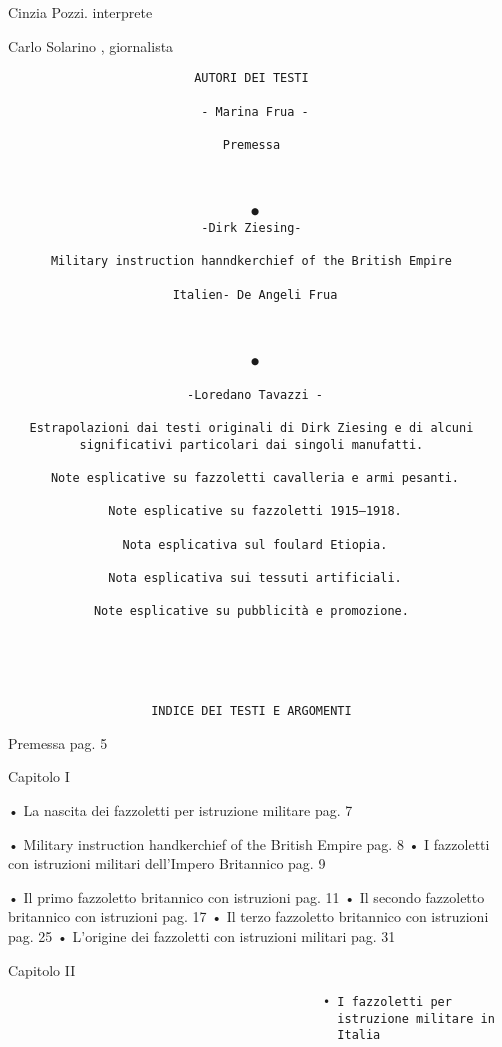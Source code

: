 Cinzia Pozzi. interprete

Carlo Solarino , giornalista

\begin{verbatim}
                          AUTORI DEI TESTI

                           - Marina Frua -

                              Premessa



                                  ●
                           -Dirk Ziesing-

      Military instruction hanndkerchief of the British Empire

                       Italien- De Angeli Frua



                                  ●

                         -Loredano Tavazzi -

   Estrapolazioni dai testi originali di Dirk Ziesing e di alcuni
          significativi particolari dai singoli manufatti.

      Note esplicative su fazzoletti cavalleria e armi pesanti.

              Note esplicative su fazzoletti 1915–1918.

                Nota esplicativa sul foulard Etiopia.

              Nota esplicativa sui tessuti artificiali.

            Note esplicative su pubblicità e promozione.





                    INDICE DEI TESTI E ARGOMENTI
\end{verbatim}

Premessa pag. 5

Capitolo I

• La nascita dei fazzoletti per istruzione militare pag. 7

• Military instruction handkerchief of the British Empire pag. 8 • I
fazzoletti con istruzioni militari dell'Impero Britannico pag. 9

• Il primo fazzoletto britannico con istruzioni pag. 11 • Il secondo
fazzoletto britannico con istruzioni pag. 17 • Il terzo fazzoletto
britannico con istruzioni pag. 25 • L'origine dei fazzoletti con
istruzioni militari pag. 31

Capitolo II

\begin{verbatim}
                                            • I fazzoletti per
                                              istruzione militare in
                                              Italia
\end{verbatim}

